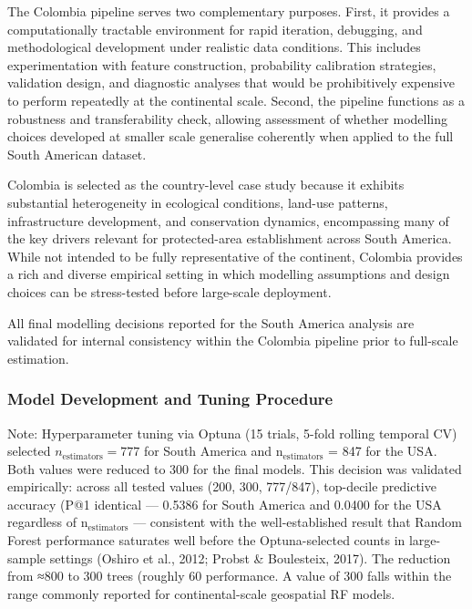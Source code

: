 \documentclass[12pt]{article}
\theoremstyle{break} %
\begin{document}
The Colombia pipeline serves two complementary purposes. First, it provides a computationally tractable environment for rapid iteration, debugging, and methodological development under realistic data conditions. This includes experimentation with feature construction, probability calibration strategies, validation design, and diagnostic analyses that would be prohibitively expensive to perform repeatedly at the continental scale. Second, the pipeline functions as a robustness and transferability check, allowing assessment of whether modelling choices developed at smaller scale generalise coherently when applied to the full South American dataset.

Colombia is selected as the country-level case study because it exhibits substantial heterogeneity in ecological conditions, land-use patterns, infrastructure development, and conservation dynamics, encompassing many of the key drivers relevant for protected-area establishment across South America. While not intended to be fully representative of the continent, Colombia provides a rich and diverse empirical setting in which modelling assumptions and design choices can be stress-tested before large-scale deployment.

All final modelling decisions reported for the South America analysis are validated for internal consistency within the Colombia pipeline prior to full-scale estimation.
\subsubsection{Model Development and Tuning Procedure}
\label{model-development}

Note: Hyperparameter tuning via Optuna (15 trials, 5-fold rolling temporal CV) selected $n_{\text{estimators}} = 777$ for South
  America and n$_{\text{estimators}}$ = 847 for the USA. Both values were reduced to 300 for the final models. This decision was
   validated empirically: across all tested values (200, 300, 777/847), top-decile predictive accuracy (P@1%
  identical — 0.5386 for South America and 0.0400 for the USA regardless of n$_{\text{estimators}}$ — consistent with the
  well-established result that Random Forest performance saturates well before the Optuna-selected counts in
  large-sample settings (Oshiro et al., 2012; Probst \& Boulesteix, 2017). The reduction from ≈800 to 300 trees
  (roughly 60%
  performance. A value of 300 falls within the range commonly reported for continental-scale geospatial RF models.
\end{document}
